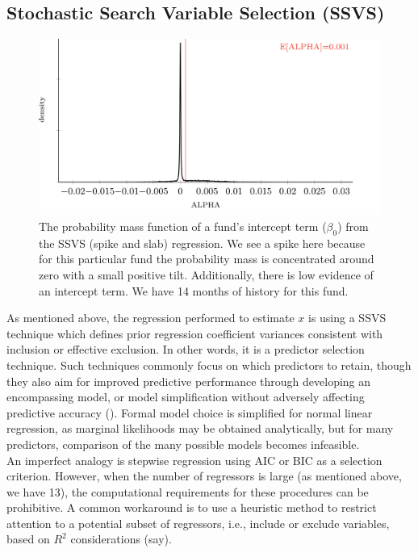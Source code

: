 \documentclass[11pt]{article}
\begin{document}
\subsection{Stochastic Search Variable Selection (SSVS)}
\label{subsec:spike_and_slab}

\begin{figure}[!h]
	\centering
	\includegraphics[width=400pt]{clinton_alpha_1_ares.png}
	\parbox{400pt}{\caption{The probability mass function of a fund's intercept term ($\beta_0$) from the SSVS (spike and slab) regression. We see a spike here because for this particular fund the probability mass is concentrated around zero with a small positive tilt. Additionally, there is low evidence of an intercept term. We have 14 months of history for this fund. }}
\end{figure}

As mentioned above, the regression performed to estimate $x$ is using a SSVS technique which defines prior regression coefficient variances consistent with inclusion or effective exclusion. In other words, it is a predictor selection technique. Such techniques commonly focus on which predictors to retain, though they also aim for improved predictive performance through developing an encompassing model, or model simplification without adversely affecting predictive accuracy (\cite{piironen_vehtari}).  Formal model choice is simplified for normal linear regression, as marginal likelihoods may be obtained analytically, but for many predictors, comparison of the many possible models becomes infeasible. \\

An imperfect analogy is stepwise regression using AIC or BIC as a selection criterion. However, when the number of regressors is large (as mentioned above, we have 13), the computational requirements for these procedures can be prohibitive. A common workaround is to use a heuristic method to restrict attention to a potential subset of regressors, i.e., include or exclude variables, based on $R^2$ considerations (say). \\
\end{document}
